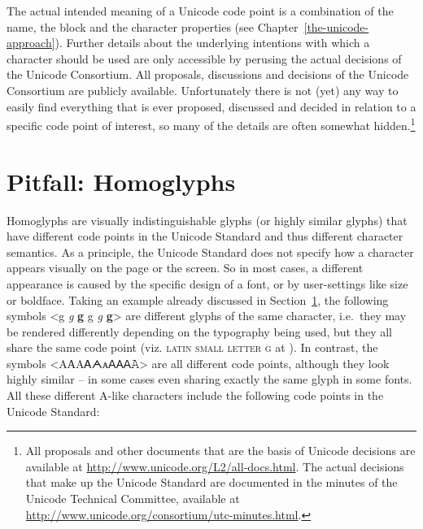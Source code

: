 The actual intended meaning of a Unicode code point is a combination of the
name, the block and the character properties (see
Chapter~\ref{the-unicode-approach}). Further details about the underlying intentions 
with which a character should be used
are only accessible by perusing the actual decisions of the Unicode Consortium.
All proposals, discussions and decisions of the Unicode Consortium are publicly
available. Unfortunately there is not (yet) any way to easily find everything
that is ever proposed, discussed and decided in relation to a specific
code point of interest, so many of the details are often somewhat
hidden.\footnote{All proposals and other documents that are the basis of Unicode
decisions are available at \url{http://www.unicode.org/L2/all-docs.html}. The
actual decisions that make up the Unicode Standard are documented in the minutes
of the Unicode Technical Committee, available at
\url{http://www.unicode.org/consortium/utc-minutes.html}.}

\section{Pitfall: Homoglyphs}
\label{pitfall-homoglyphs}

Homoglyphs are visually indistinguishable glyphs (or highly similar glyphs) that
have different code points in the Unicode Standard and thus different character
semantics. As a principle, the Unicode Standard does not specify how a character
appears visually on the page or the screen. So in most cases, a different
appearance is caused by the specific design of a font, or by user-settings like
size or boldface. Taking an example already discussed in
Section~\ref{pitfall-homoglyphs}, the following symbols <g {\large \textit{g}}
\textbf{g} { {\small g} \textit{g} \textbf{g}}> are different
glyphs of the same character, i.e.~they may be rendered differently depending on
the typography being used, but they all share the same code point (viz.
\textsc{latin small letter g} at ). In contrast, the symbols
<{AАΑᎪᗅᴀꓮ𐊠𝖠𝙰}> are all different code points,
although they look highly similar -- in some cases even sharing exactly the same
glyph in some fonts. All these different A-like characters include the following
code points in the Unicode Standard:

